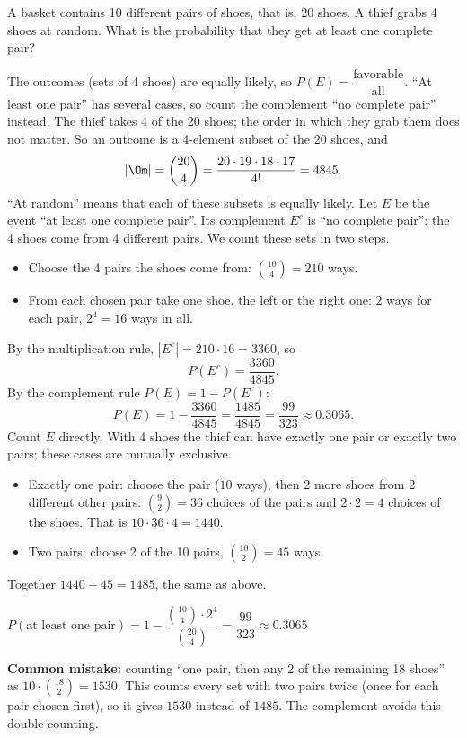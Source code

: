 
\begin{problem}
	A basket contains 10 different pairs of shoes, that is, 20 shoes. A thief
	grabs 4 shoes at random. What is the probability that they get at least one
	complete pair?
\end{problem}

\begin{solution}
	\idea The outcomes (sets of 4 shoes) are equally likely, so
	$P(E)=\dfrac{\text{favorable}}{\text{all}}$. ``At least one pair'' has
	several cases, so count the complement ``no complete pair'' instead.
	 The thief takes 4 of the 20 shoes; the order in which
	they grab them does not matter. So an outcome is a 4-element subset of the
	20 shoes, and
	\[ |\Om|=\binom{20}{4}=\frac{20\cdot19\cdot18\cdot17}{4!}=4845. \]
	``At random'' means that each of these subsets is equally likely.
	 Let $E$ be the event ``at least one complete pair''. Its
	complement $E^c$ is ``no complete pair'': the 4 shoes come from 4
	different pairs. We count these sets in two steps.
	\begin{itemize}
		\item Choose the 4 pairs the shoes come from: $\binom{10}{4}=210$ ways.
		\item From each chosen pair take one shoe, the left or the right one:
		$2$ ways for each pair, $2^4=16$ ways in all.
	\end{itemize}
	By the multiplication rule, $|E^c|=210\cdot16=3360$, so
	\[ P(E^c)=\frac{3360}{4845}. \]
	 By the complement rule $P(E)=1-P(E^c)$:
	\[ P(E)=1-\frac{3360}{4845}=\frac{1485}{4845}=\frac{99}{323}\approx0.3065. \]
	 Count $E$ directly. With 4 shoes the thief can have exactly
	one pair or exactly two pairs; these cases are mutually exclusive.
	\begin{itemize}
		\item Exactly one pair: choose the pair ($10$ ways), then 2 more shoes
		from 2 different other pairs: $\binom{9}{2}=36$ choices of the pairs
		and $2\cdot2=4$ choices of the shoes. That is $10\cdot36\cdot4=1440$.
		\item Two pairs: choose 2 of the 10 pairs, $\binom{10}{2}=45$ ways.
	\end{itemize}
	Together $1440+45=1485$, the same as above.
	\begin{answer}
		$P(\text{at least one pair})=1-\dfrac{\binom{10}{4}\cdot2^4}{\binom{20}{4}}
		=\dfrac{99}{323}\approx0.3065$
	\end{answer}
	\begin{remark}
		\textbf{Common mistake:} counting ``one pair, then any 2 of the remaining
		18 shoes'' as $10\cdot\binom{18}{2}=1530$. This counts every set with two
		pairs twice (once for each pair chosen first), so it gives $1530$
		instead of $1485$. The complement avoids this double counting.
	\end{remark}
\end{solution}
